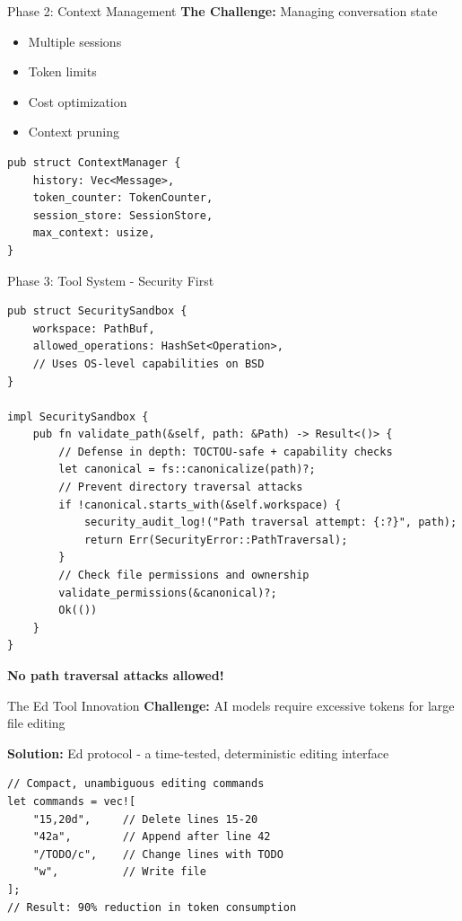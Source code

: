 \documentclass[aspectratio=169]{beamer}
\begin{document}
\begin{frame}[fragile]{Phase 2: Context Management}
\textbf{The Challenge:} Managing conversation state
\begin{itemize}
\item Multiple sessions
\item Token limits
\item Cost optimization
\item Context pruning
\end{itemize}

\begin{lstlisting}
pub struct ContextManager {
    history: Vec<Message>,
    token_counter: TokenCounter,
    session_store: SessionStore,
    max_context: usize,
}
\end{lstlisting}
\end{frame}

\begin{frame}[fragile]{Phase 3: Tool System - Security First}
\begin{lstlisting}
pub struct SecuritySandbox {
    workspace: PathBuf,
    allowed_operations: HashSet<Operation>,
    // Uses OS-level capabilities on BSD
}

impl SecuritySandbox {
    pub fn validate_path(&self, path: &Path) -> Result<()> {
        // Defense in depth: TOCTOU-safe + capability checks
        let canonical = fs::canonicalize(path)?;
        // Prevent directory traversal attacks
        if !canonical.starts_with(&self.workspace) {
            security_audit_log!("Path traversal attempt: {:?}", path);
            return Err(SecurityError::PathTraversal);
        }
        // Check file permissions and ownership
        validate_permissions(&canonical)?;
        Ok(())
    }
}
\end{lstlisting}

\textbf{No path traversal attacks allowed!}
\end{frame}

\begin{frame}[fragile]{The Ed Tool Innovation}
\textbf{Challenge:} AI models require excessive tokens for large file editing

\textbf{Solution:} Ed protocol - a time-tested, deterministic editing interface
\begin{lstlisting}
// Compact, unambiguous editing commands
let commands = vec![
    "15,20d",     // Delete lines 15-20
    "42a",        // Append after line 42
    "/TODO/c",    // Change lines with TODO
    "w",          // Write file
];
// Result: 90% reduction in token consumption
\end{lstlisting}
\end{frame}
\end{document}
